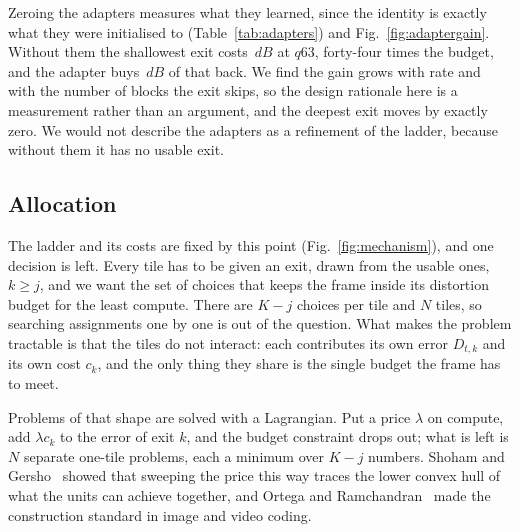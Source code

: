 \documentclass[10pt,twocolumn,letterpaper]{article}
\newcommand{\dB}{\,dB}
\begin{document}
Zeroing the adapters measures what they learned, since the identity is exactly
what they were initialised to (Table~\ref{tab:adapters}) and Fig.~\ref{fig:adaptergain}. Without them the
shallowest exit costs \AdapterNoneHigh$\dB$ at $q63$, forty-four times the
budget, and the adapter buys \AdapterGainHigh$\dB$ of that back. We find the gain
grows with rate and with the number of blocks the exit skips, so the design
rationale here is a measurement rather than an argument, and the deepest exit
moves by exactly zero. We would not describe the adapters as a refinement of the
ladder, because without them it has no usable exit.

\subsection{Allocation}
\label{sec:alloc}

The ladder and its costs are fixed by this point (Fig.~\ref{fig:mechanism}), and one decision is left. Every
tile has to be given an exit, drawn from the usable ones, $k \ge j$, and we want
the set of choices that keeps the frame inside its distortion budget for the least
compute. There are $K-j$ choices per tile and $N$ tiles, so searching assignments
one by one is out of the question. What makes the problem tractable is that the
tiles do not interact: each contributes its own error $D_{t,k}$ and its own cost
$c_k$, and the only thing they share is the single budget the frame has to meet.

Problems of that shape are solved with a Lagrangian. Put a price $\lambda$ on
compute, add $\lambda c_k$ to the error of exit $k$, and the budget constraint
drops out; what is left is $N$ separate one-tile problems, each a minimum over
$K-j$ numbers. Shoham and Gersho~\cite{shoham1988} showed that sweeping the price
this way traces the lower convex hull of what the units can achieve together, and
Ortega and Ramchandran~\cite{ortega1998} made the construction standard in image
and video coding.
\end{document}
